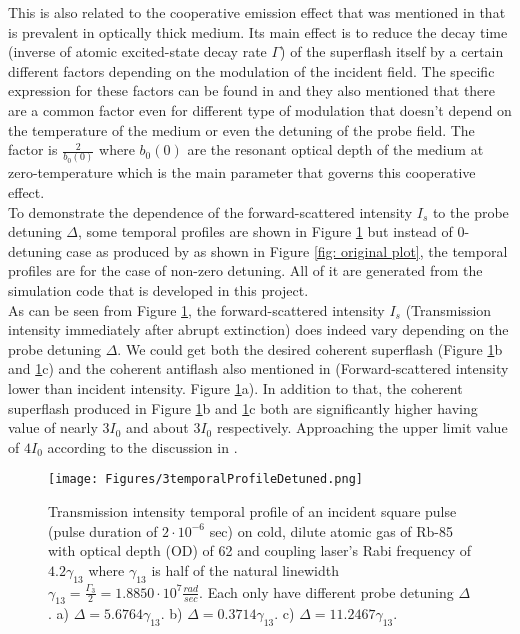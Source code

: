 This is also related to the cooperative emission effect that was mentioned in \cite{Kwong2014, Kwong2015, Kwong2017, Araujo2016} that is prevalent in optically thick medium. Its main effect is to reduce the decay time (inverse of atomic excited-state decay rate $\Gamma$) of the superflash itself by a certain different factors depending on the modulation of the incident field. The specific expression for these factors can be found in \cite{Kwong2017} and they also mentioned that there are a common factor even for different type of modulation that doesn't depend on the temperature of the medium or even the detuning of the probe field. The factor is $\frac{2}{b_{0}(0)}$ where $b_{0}(0)$ are the resonant optical depth of the medium at zero-temperature which is the main parameter that governs this cooperative effect.\\

To demonstrate the dependence of the forward-scattered intensity $I_{s}$ to the probe detuning $\Delta$, some temporal profiles are shown in Figure \ref{fig: comparing temporal profile} but instead of 0-detuning case as produced by \cite{jeong2010slow} as shown in Figure \ref{fig: original plot}, the temporal profiles are for the case of non-zero detuning. All of it are generated from the simulation code that is developed in this project.\\

As can be seen from Figure \ref{fig: comparing temporal profile}, the forward-scattered intensity $I_{s}$ (Transmission intensity immediately after abrupt extinction) does indeed vary depending on the probe detuning $\Delta$. We could get both the desired coherent superflash (Figure \ref{fig: comparing temporal profile}b and \ref{fig: comparing temporal profile}c) and the coherent antiflash also mentioned in \cite{Kwong2017} (Forward-scattered intensity lower than incident intensity. Figure \ref{fig: comparing temporal profile}a). In addition to that, the coherent superflash produced in Figure \ref{fig: comparing temporal profile}b and \ref{fig: comparing temporal profile}c both are significantly higher having value of nearly $3I_{0}$ and about $3I_{0}$ respectively. Approaching the upper limit value of $4I_{0}$ according to the discussion in \cite{Kwong2014}.

\begin{figure}[h!]
    \centering
    \texttt{[image: Figures/3temporalProfileDetuned.png]}
    \caption{Transmission intensity temporal profile of an incident square pulse (pulse duration of $2\cdot10^{-6}$ sec) on cold, dilute atomic gas of Rb-85 with optical depth (OD) of 62 and coupling laser's Rabi frequency of $4.2\gamma_{13}$ where $\gamma_{13}$ is half of the natural linewidth $\gamma_{13} = \frac{\Gamma_{3}}{2} = 1.8850 \cdot 10^{7} \frac{rad}{sec}$. Each only have different probe detuning $\Delta$. a) $\Delta = 5.6764\gamma_{13}$. b) $\Delta = 0.3714\gamma_{13}$. c) $\Delta = 11.2467\gamma_{13}$.}
    \label{fig: comparing temporal profile}
\end{figure}


